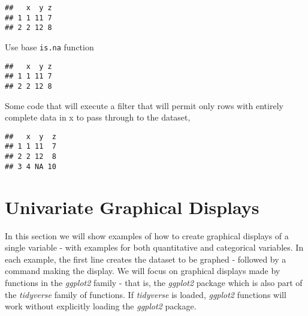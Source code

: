 \documentclass[]{book}
\newenvironment{Shaded}{\begin{snugshade}}{\end{snugshade}}
\newcommand{\KeywordTok}[1]{\textcolor[rgb]{0.13,0.29,0.53}{\textbf{#1}}}
\newcommand{\StringTok}[1]{\textcolor[rgb]{0.31,0.60,0.02}{#1}}
\newcommand{\CommentTok}[1]{\textcolor[rgb]{0.56,0.35,0.01}{\textit{#1}}}
\newcommand{\OperatorTok}[1]{\textcolor[rgb]{0.81,0.36,0.00}{\textbf{#1}}}
\newcommand{\NormalTok}[1]{#1}
\begin{document}
\begin{verbatim}
##   x  y z
## 1 1 11 7
## 2 2 12 8
\end{verbatim}

Use base \texttt{is.na} function

\begin{Shaded}
\end{Shaded}

\begin{verbatim}
##   x  y z
## 1 1 11 7
## 2 2 12 8
\end{verbatim}

Some code that will execute a filter that will permit only rows with
entirely complete data in x to pass through to the dataset,

\begin{Shaded}
\end{Shaded}

\begin{verbatim}
##   x  y  z
## 1 1 11  7
## 2 2 12  8
## 3 4 NA 10
\end{verbatim}

\chapter{Univariate Graphical
Displays}\label{UnivariateGraphicalDisplays}

In this section we will show examples of how to create graphical
displays of a single variable - with examples for both quantitative and
categorical variables. In each example, the first line creates the
dataset to be graphed - followed by a command making the display. We
will focus on graphical displays made by functions in the \emph{ggplot2}
family - that is, the \emph{ggplot2} package which is also part of the
\emph{tidyverse} family of functions. If \emph{tidyverse} is loaded,
\emph{ggplot2} functions will work without explicitly loading the
\emph{ggplot2} package.
\end{document}
